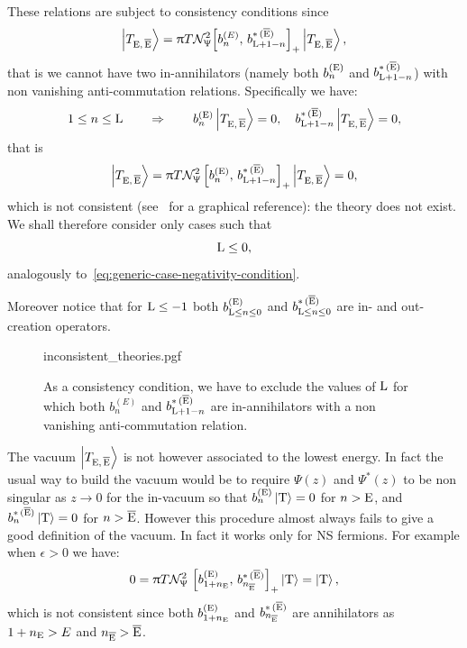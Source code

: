 These relations are subject to consistency conditions since
\begin{equation}
  \ket{T_{\mathrm{E},\, \overline{\mathrm{E}}}}
  =
  \uppi T \mathcal{N}_{\Uppsi}^2 \qty[b^{(E)}_n,\, b^{*\, ( \overline{\mathrm{E}} )}_{\mathrm{L}+1-n}]_+ \ket{T_{\mathrm{E},\, \overline{\mathrm{E}}}},
\end{equation}
that is we cannot have two in-annihilators (namely both $b^{(\mathrm{E})}_n$ and $b^{*\, ( \overline{\mathrm{E}} )}_{\mathrm{L}+1-n}$) with non vanishing anti-commutation relations.
Specifically we have:
\begin{equation}
  1 \le n \le \mathrm{L}
  \qquad \Rightarrow \qquad
  b^{(\mathrm{E})}_n \ket{T_{\mathrm{E},\, \overline{\mathrm{E}}}} = 0,
  \quad
  b^{*\, ( \overline{\mathrm{E}} )}_{\mathrm{L} + 1 - n} \ket{T_{\mathrm{E},\, \overline{\mathrm{E}}}} = 0,
\end{equation}
that is
\begin{equation}
  \ket{T_{\mathrm{E},\, \overline{\mathrm{E}}}}
  =
  \uppi T \mathcal{N}_{\Uppsi}^2 \left[ b^{(\mathrm{E})}_n,\, b^{*\, ( \overline{\mathrm{E}} )}_{\mathrm{L} + 1 - n} \right]_+ \ket{T_{\mathrm{E},\, \overline{\mathrm{E}}}}
  =
  0,
\end{equation}
which is not consistent (see~ for a graphical reference): the theory does not exist.
We shall therefore consider only cases such that
\begin{equation}
  \mathrm{L} \le 0,
\end{equation}
analogously to~\eqref{eq:generic-case-negativity-condition}.

Moreover notice that for $\mathrm{L} \le -1$ both $b^{(\mathrm{E})}_{\mathrm{L} \le n \le 0}$ and $b^{*\, ( \overline{\mathrm{E}} )}_{\mathrm{L} \le n \le 0}$ are in- and out-creation operators.

\begin{figure}[tbp]
  \centering
  {inconsistent_theories.pgf}
  \caption{As a consistency condition, we have to exclude the values of
  $\mathrm{L}$ for which both $b^{(
E)}_n$ and $b^{*\, ( \overline{\mathrm{E}} )}_{\mathrm{L} + 1 - n}$ are in-annihilators
  with a non vanishing anti-commutation relation.}
  \label{fig:inconsistent-theories}
\end{figure}

The vacuum $\ket{T_{\mathrm{E},\, \overline{\mathrm{E}}}}$ is not however associated to the lowest energy.
In fact the usual way to build the vacuum would be to require $\Psi( z )$ and $\Psi^*( z )$ to be non singular as $z \to 0$ for the in-vacuum so that $b^{(\mathrm{E})}_n \ket{\mathrm{T}} = 0$ for $n > \mathrm{E}$, and $b^{*\, ( \overline{\mathrm{E}} )}_n \ket{\mathrm{T}} = 0$ for $n > \overline{\mathrm{E}}$.
However this procedure almost always fails to give a good  definition of the vacuum.
In fact it works only for NS fermions.
For example when $\epsilon > 0$ we have:
\begin{equation}
  0
  =
  \uppi T \mathcal{N}_{\Uppsi}^2\,
  \left[ b^{(\mathrm{E})}_{1 + n_{\mathrm{E}} },\, b^{*\, ( \overline{\mathrm{E}} )}_{n_{\overline{\mathrm{E}}} } \right]_+
  \ket{\mathrm{T}}
  =
  \ket{\mathrm{T}},
\end{equation}
which is not consistent since both  $b^{(\mathrm{E})}_{1 + n_{\mathrm{E}}}$ and $b^{*\, ( \overline{\mathrm{E}} )}_{n_{\overline{\mathrm{E}}}}$ are annihilators as $1 + n_{\mathrm{E}} > E$ and $n_{\overline{\mathrm{E}}} > \overline{\mathrm{E}}$.

